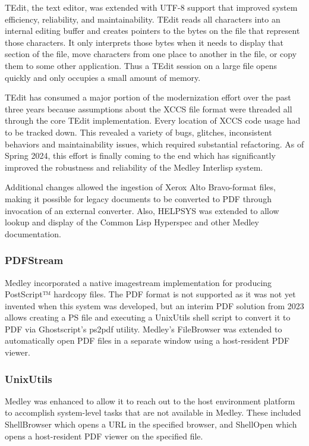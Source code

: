\documentclass[sigconf]{acmart}
\begin{document}
TEdit, the text editor, was extended with UTF-8 support that improved system efficiency, reliability, and maintainability\cite{Xerox86}. TEdit reads all characters into an internal editing buffer and creates pointers to the bytes on the file that represent those characters. It only interprets those bytes when it needs to display that section of the file, move characters from one place to another in the file, or copy them to some other application. Thus a TEdit session on a large file opens quickly and only occupies a small amount of memory.

TEdit has consumed a major portion of the modernization effort over the past three years because assumptions about the XCCS file format were threaded all through the core TEdit implementation. Every location of XCCS code usage had to be tracked down. This revealed a variety of bugs, glitches, inconsistent behaviors and maintainability issues, which required substantial refactoring. As of Spring 2024, this effort is finally coming to the end which has significantly improved the robustness and reliability of the Medley Interlisp system.

Additional changes allowed the ingestion of Xerox Alto Bravo-format files, making it possible for legacy documents to be converted to PDF through invocation of an external converter. Also, HELPSYS was extended to allow lookup and display of the Common Lisp Hyperspec and other Medley documentation.

\subsubsection{PDFStream}
Medley incorporated a native imagestream implementation for producing PostScript™ hardcopy files. The PDF format is not supported as it was not yet invented when this system was developed, but an interim PDF solution from 2023 allows creating a PS file and executing a UnixUtils shell script to convert it to PDF via Ghostscript's ps2pdf utility. Medley's FileBrowser was extended to automatically open PDF files in a separate window using a host-resident PDF viewer.

\subsubsection{UnixUtils}

Medley was enhanced to allow it to reach out to the host environment platform to accomplish system-level tasks that are not available in Medley. These included ShellBrowser which opens a URL in the specified browser, and ShellOpen which opens a host-resident PDF viewer on the specified file.
\end{document}
